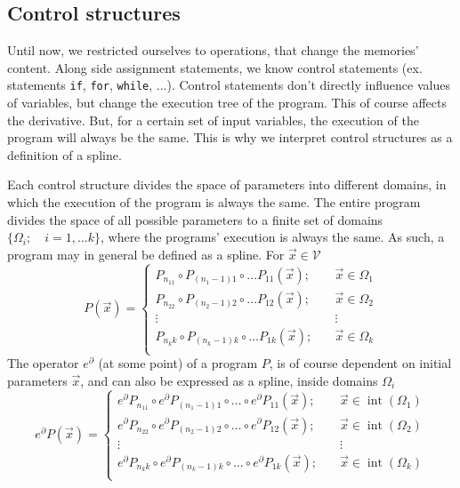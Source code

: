 \documentclass{article}
\newcommand{\VV}{\mathcal{V}}
\newcommand{\D}{\partial}
\DeclareMathOperator{\interior}{int}
\begin{document}
 \subsection{Control structures}\label{sec:control}
 
 Until now, we restricted ourselves to operations, that change the memories' content. Along side assignment statements, we know control statements (ex. statements \texttt{if},
  \texttt{for}, \texttt{while}, ...). Control statements don't directly influence values of variables, but change the execution tree of the program. This of course affects the derivative. But, for a certain set of input variables, the execution of the program will always be the same. This is why we interpret control structures as a definition of a spline.
  
 Each control structure divides the space of parameters into different domains, in which the execution of the program is always the same. The entire program divides the space of all possible parameters to a finite set of domains $\{\Omega_i;\quad i=1,\ldots
  k\}$, where the programs' execution is always the same. As such, a program may in general be defined as a spline. For $\vec{x}\in\VV$
 \begin{equation}
   \label{eq:zlrprk_splosno}
   P(\vec{x}) =
   \begin{cases}
     P_{n_11}\circ P_{(n_1-1)1}\circ\ldots P_{11}(\vec{x});&\quad \vec{x}\in\Omega_1\\
     P_{n_22}\circ P_{(n_2-1)2}\circ\ldots P_{12}(\vec{x});&\quad \vec{x}\in\Omega_2\\
     \vdots&\quad\vdots\\
     P_{n_kk}\circ P_{(n_k-1)k}\circ\ldots P_{1k}(\vec{x});&\quad \vec{x}\in\Omega_k\\
   \end{cases}
 \end{equation}
 The operator $e^\D$ (at some point) of a program $P$, is of course dependent on initial parameters $\vec{x}$, and can also be expressed as a spline, inside domains $\Omega_i$
 \begin{equation}
   \label{eq:Dzlrprk_splosno}
   e^\D P({\vec{x}}) =
   \begin{cases}
     e^\D P_{n_11}\circ e^\D P_{(n_1-1)1}\circ\ldots\circ e^\D P_{11}(\vec{x});&\quad \vec{x}\in\interior(\Omega_1)\\
     e^\D P_{n_22}\circ e^\D P_{(n_2-1)2}\circ\ldots\circ e^\D P_{12}(\vec{x});&\quad \vec{x}\in\interior(\Omega_2)\\
     \vdots&\quad\vdots\\
     e^\D P_{n_kk}\circ e^\D P_{(n_k-1)k}\circ\ldots\circ e^\D P_{1k}(\vec{x});&\quad \vec{x}\in\interior(\Omega_k)\\
   \end{cases}
 \end{equation}
\end{document}
